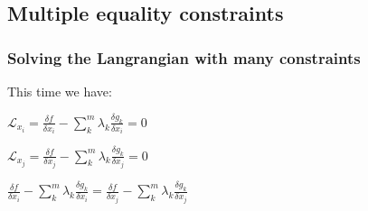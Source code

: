 
\subsection{Multiple equality constraints}

\subsubsection{Solving the Langrangian with many constraints}

This time we have:

\(\mathcal{L}_{x_i}=\frac{\delta f}{\delta x_i}-\sum^m_k\lambda_k \frac{\delta g_k}{\delta x_i}=0\)

\(\mathcal{L}_{x_j}=\frac{\delta f}{\delta x_j}-\sum^m_k\lambda_k \frac{\delta g_k}{\delta x_j}=0\)

\(\frac{\delta f}{\delta x_i}-\sum^m_k\lambda_k \frac{\delta g_k}{\delta x_i}=\frac{\delta f}{\delta x_j}-\sum^m_k\lambda_k \frac{\delta g_k}{\delta x_j}\)

